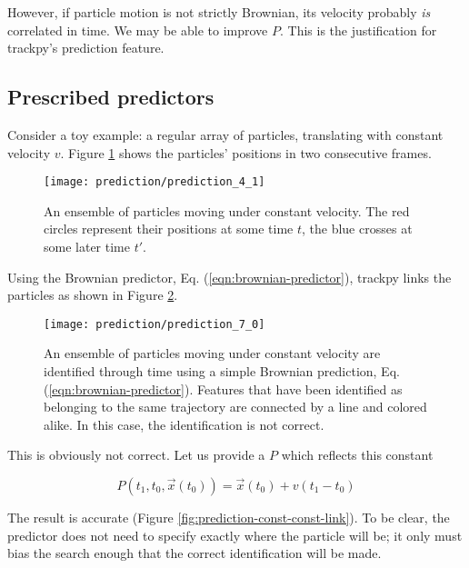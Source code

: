 However, if particle motion is not strictly Brownian, its velocity
probably \emph{is} correlated in time. We may be able to improve $P$. This 
is the justification for trackpy's prediction feature.

\subsection{Prescribed predictors}\label{prescribed-predictors}

Consider a toy example: a regular array of particles,
translating with constant velocity $v$. Figure \ref{fig:prediction-const-features}
shows the particles' positions in two consecutive frames.

    \begin{figure}
    \centering
    \texttt{[image: prediction/prediction\_4\_1]}
    \caption{\label{fig:prediction-const-features}An ensemble of particles moving under constant velocity. The red circles represent their positions at some time $t$, the blue crosses at some later time $t'$.}
    \end{figure}

\noindent Using the Brownian predictor, Eq. (\ref{eqn:brownian-predictor}), trackpy links the particles as shown in Figure \ref{fig:prediction-const-brownian-link}.

   \begin{figure}
    \centering
    \texttt{[image: prediction/prediction\_7\_0]}
    \caption{\label{fig:prediction-const-brownian-link}An ensemble of particles moving under constant velocity are identified through time using a simple Brownian prediction, Eq. (\ref{eqn:brownian-predictor}). Features that have been identified as belonging to the same trajectory are connected by a line and colored alike. In this case, the identification is not correct.}
    \end{figure}
    
\noindent This is obviously not correct. Let us provide a $P$ which reflects this constant

\begin{equation}
\label{eqn:const-predictor}
P(t_1, t_0, \vec x(t_0)) = \vec x(t_0) + v(t_1 - t_0)
\end{equation}

\noindent The result is accurate (Figure \ref{fig:prediction-const-const-link}). To be clear, the predictor does not need to specify exactly where the
particle will be; it only must bias the search enough that the correct
identification will be made.

